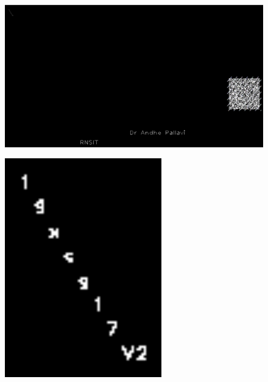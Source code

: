 \begin{figure}[H]
	\centering
	\includegraphics[width=0.8\linewidth]{"images/generation_qr_nqr/Screenshot (82)"}
	\label{fig:screenshot-82}
\end{figure}
\begin{figure}[H]
	\centering
	\includegraphics[width=0.7\linewidth]{"images/generation_qr_nqr/Screenshot (83)"}
	\label{fig:screenshot-83}
\end{figure}
